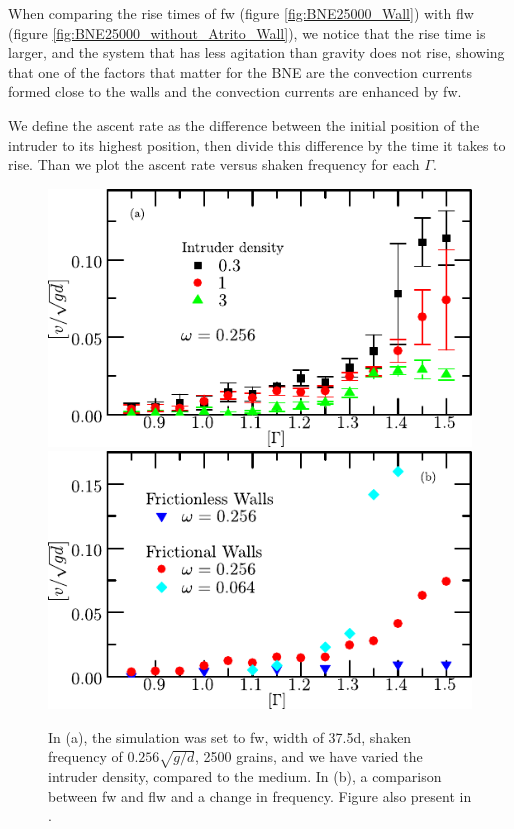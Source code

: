     When comparing the rise times of fw (figure \ref{fig:BNE25000_Wall}) with flw (figure \ref{fig:BNE25000_without_Atrito_Wall}), we notice that the rise time is larger, and the system that has less agitation than gravity does not rise, showing that one of the factors that matter for the BNE are the convection currents formed close to the walls and the convection currents are enhanced by fw.

    We define the ascent rate as the difference between the initial position of the intruder to its highest position, then divide this difference by the time it takes to rise. Than we plot the ascent rate versus shaken frequency for each $\Gamma$.

\begin{figure}
    \includegraphics[width=0.65\linewidth]{04-figuras/BNE_FW_Density.pdf}
    \includegraphics[width=0.65\linewidth]{04-figuras/BNE_W.pdf}
    \caption{In (a), the simulation was set to fw, width of 37.5d, shaken frequency of $0.256\sqrt{g/d}$, 2500 grains, and we have varied the intruder density, compared to the medium. In (b), a comparison between fw and flw and a change in frequency. Figure also present in \cite{Large-deviation_quantification_of_boundary_conditions_on_the_Brazil_nut_effect}.}
    \label{fig:BNE_walls}
\end{figure}


